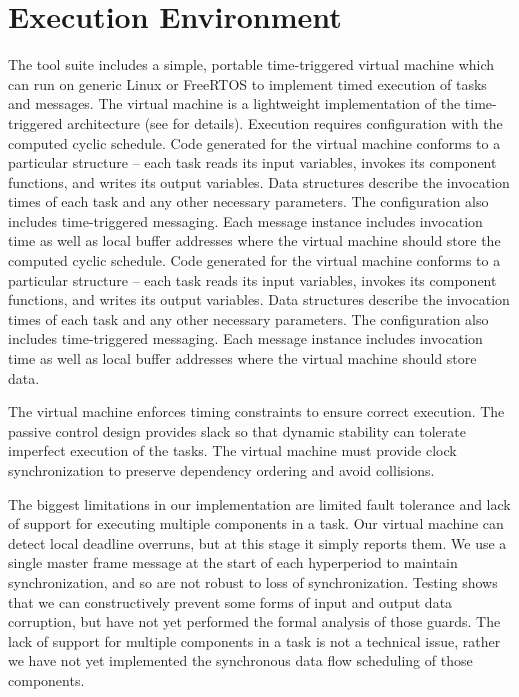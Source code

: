 \section{Execution Environment}

The tool suite includes a simple, portable time-triggered virtual machine\cite{timed:frodo} 
which can run on generic Linux or FreeRTOS to implement timed execution of tasks and messages.  
The virtual machine is a lightweight implementation of the time-triggered 
architecture\cite{timed:tta} (see \cite{timed:frodo} for details).  Execution requires 
configuration with the computed cyclic schedule.  Code generated for the virtual machine 
conforms to a particular structure -- each task reads its input variables, invokes its 
component functions, and writes its output variables.  Data structures describe the invocation 
times of each task and any other necessary parameters.  The configuration also includes 
time-triggered messaging.  Each message instance includes invocation time as well as local buffer 
addresses where the virtual machine should store the computed cyclic schedule.  Code generated for 
the virtual machine conforms to a particular structure -- each task reads its input variables, 
invokes its component functions, and writes its output variables.  Data structures describe the 
invocation times of each task and any other necessary parameters.  The configuration also includes 
time-triggered messaging.  Each message instance includes invocation time as well as local buffer 
addresses where the virtual machine should store data.

The virtual machine enforces timing constraints to ensure correct execution. The passive 
control design provides slack so that dynamic stability can tolerate imperfect execution 
of the tasks.  The virtual machine must provide clock synchronization to preserve dependency 
ordering and avoid collisions.

The biggest limitations in our implementation are limited fault tolerance and lack of support 
for executing multiple components in a task. Our virtual machine can detect local deadline 
overruns, but at this stage it simply reports them.  We use a single master frame message 
at the start of each hyperperiod to maintain synchronization, and so are not robust to 
loss of synchronization.  Testing shows that we can constructively prevent some forms of 
input and output data corruption, but have not yet performed the formal analysis of those 
guards. The lack of support for multiple components in a task 
is not a technical issue, rather we have not yet implemented the synchronous data flow 
scheduling of those components.
